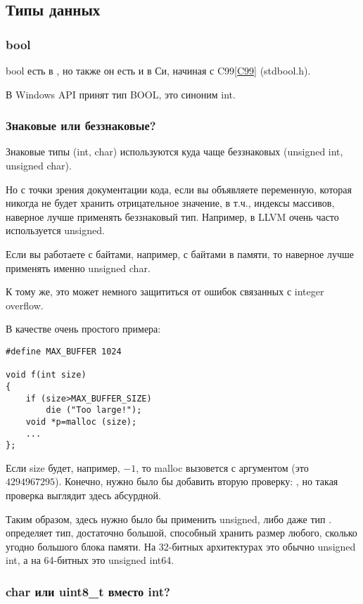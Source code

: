 ﻿\subsection{Типы данных}

\subsubsection{bool}

bool есть в \CPP, но также он есть и в Си, начиная с C99\ref{C99} (stdbool.h).

В Windows API принят тип BOOL, это синоним int.

\subsubsection{Знаковые или беззнаковые?}

Знаковые типы (int, char) используются куда чаще беззнаковых (unsigned int, unsigned char).

Но с точки зрения документации кода, если вы объявляете переменную, которая никогда не будет хранить отрицательное
значение, в т.ч., индексы массивов, наверное лучше применять беззнаковый тип.
Например, в LLVM очень часто используется unsigned.

Если вы работаете с байтами, например, с байтами в памяти, то наверное лучше применять именно unsigned char.

К тому же, это может немного защититься от ошибок связанных с integer overflow\cite{Phrack3C0A}.

В качестве очень простого примера:

\begin{lstlisting}
#define MAX_BUFFER 1024

void f(int size)
{
	if (size>MAX_BUFFER_SIZE)
		die ("Too large!");
	void *p=malloc (size);
	...
};
\end{lstlisting}

Если size будет, например, $-1$, то malloc вызовется с аргументом  (это $4294967295$).
Конечно, нужно было бы добавить вторую проверку: , но такая проверка выглядит здесь абсурдной.

Таким образом, здесь нужно было бы применить unsigned, либо даже тип . 
 определяет тип, достаточно большой,
способный хранить размер любого, сколько угодно большого блока памяти.
На 32-битных архитектурах это обычно unsigned int,
а на 64-битных это unsigned int64.

\subsubsection{char или uint8\_t вместо int?}


